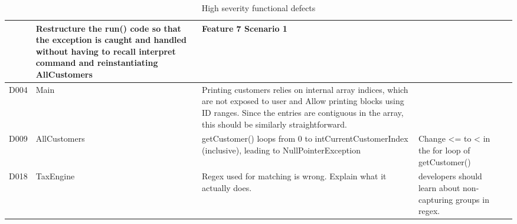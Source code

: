 \begin{table}[H]
\begin{tabularx}{\textwidth}{| c | P | X | X | P |}
& Restructure the run() code so that the exception is caught and handled without having to recall interpret command and reinstantiating AllCustomers 
& Feature 7 Scenario 1 \\
\hline %
D004 
& Main 
& Printing customers relies on internal array indices, which are not exposed to user and Allow printing blocks using ID ranges. Since the entries are contiguous in the array, this should be similarly straightforward. 
& 
& \\
\hline %
D009 
& AllCustomers 
& getCustomer() loops from 0 to intCurrentCustomerIndex (inclusive), leading to NullPointerException
& Change <= to < in the for loop of getCustomer() 
& \\
\hline %
D018 
& TaxEngine 
& Regex used for matching is wrong. Explain what it actually does. 
&  developers should learn about non-capturing groups in regex. 
& \\
\hline %
\end{tabularx}
\caption{High severity functional defects}
\end{table}